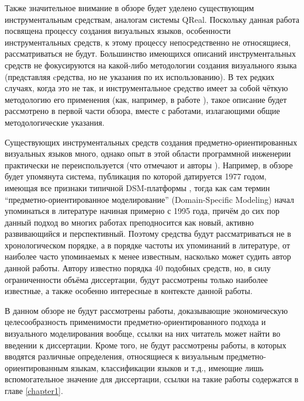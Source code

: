 Также значительное внимание в обзоре будет уделено существующим инструментальным средствам, 
аналогам системы QReal. Поскольку данная работа посвящена процессу создания визуальных 
языков, особенности инструментальных средств, к этому процессу непосредственно не 
относящиеся, рассматриваться не будут.
Большинство имеющихся описаний инструментальных средств не фокусируются на какой-либо методологии создания визуального языка (представляя 
cредства, но не указания по их использованию). В тех редких случаях, когда это не так, 
и инструментальное средство имеет за собой чёткую методологию его применения (как, 
например, в работе \cite{repenning1995agentsheets}), такое описание будет рассмотрено в 
первой части обзора, вместе с работами, излагающими общие методологические указания.

Существующих инструментальных средств создания предметно-ориентированных визуальных 
языков много, однако опыт в этой области программной инженерии практически не переиспользуется 
(что отмечают и авторы \cite{kelly2008domain}). Например, в обзоре будет упомянута 
система, публикация по которой датируется 1977 годом, имеющая все признаки типичной 
DSM-платформы \cite{teichroew1977psl}, тогда как сам термин "`предметно-ориентированное 
моделирование"' (Domain-Specific Modeling) начал упоминаться в литературе начиная примерно с 
1995 года, 
причём до сих пор данный подход во многих работах преподносится как новый, активно 
развивающийся и перспективный. Поэтому средства будут рассматриваться не в хронологическом 
порядке, а в порядке частоты их упоминаний в литературе, от наиболее часто упоминаемых к менее 
известным, насколько может судить автор данной работы. Автору известно порядка 40 подобных
средств, но, в силу ограниченности объёма диссертации, будут рассмотрены только наиболее 
известные, а также особенно интересные в контексте данной работы.

В данном обзоре не будут рассмотрены работы, доказывающие экономическую целесообразность
применимости предметно-ориентированного подхода и визуального моделирования вообще,
ссылки на них читатель может найти во введении к диссертации. Кроме того, не будут
рассмотрены работы, в которых вводятся различные определения, относящиеся к визуальным
предметно-ориентированным языкам, классификации языков и т.д., имеющие лишь вспомогательное
значение для диссертации, ссылки на такие работы содержатся в главе \ref{chapter1}.

